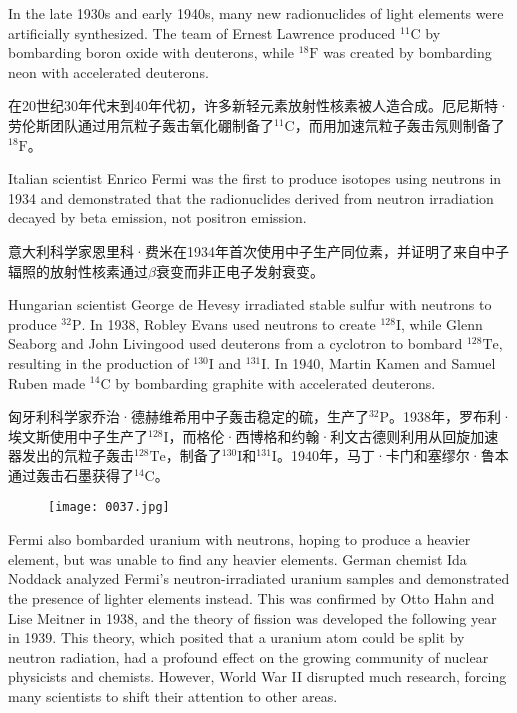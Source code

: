 \documentclass[dvipsnames, svgnames,a4paper,11pt]{article}
\begin{document}
In the late 1930s and early 1940s, many new radionuclides of light elements were artificially synthesized. The team of Ernest Lawrence produced ${}^\text{11}\text{C}$ by bombarding boron oxide with deuterons, while ${}^\text{18}\text{F}$ was created by bombarding neon with accelerated deuterons.

在20世纪30年代末到40年代初，许多新轻元素放射性核素被人造合成。厄尼斯特·劳伦斯团队通过用氘粒子轰击氧化硼制备了${}^\text{11}\text{C}$，而用加速氘粒子轰击氖则制备了${}^\text{18}\text{F}$。

Italian scientist Enrico Fermi was the first to produce isotopes using neutrons in 1934 and demonstrated that the radionuclides derived from neutron irradiation decayed by beta emission, not positron emission.

意大利科学家恩里科·费米在1934年首次使用中子生产同位素，并证明了来自中子辐照的放射性核素通过$\beta$衰变而非正电子发射衰变。

Hungarian scientist George de Hevesy irradiated stable sulfur with neutrons to produce ${}^\text{32}\text{P}$. In 1938, Robley Evans used neutrons to create ${}^\text{128}\text{I}$, while Glenn Seaborg and John Livingood used deuterons from a cyclotron to bombard ${}^\text{128}\text{Te}$, resulting in the production of ${}^\text{130}\text{I}$ and ${}^\text{131}\text{I}$. In 1940, Martin Kamen and Samuel Ruben made ${}^\text{14}\text{C}$ by bombarding graphite with accelerated deuterons.

匈牙利科学家乔治·德赫维希用中子轰击稳定的硫，生产了${}^\text{32}\text{P}$。1938年，罗布利·埃文斯使用中子生产了${}^\text{128}\text{I}$，而格伦·西博格和约翰·利文古德则利用从回旋加速器发出的氘粒子轰击${}^\text{128}\text{Te}$，制备了${}^\text{130}\text{I}$和${}^\text{131}\text{I}$。1940年，马丁·卡门和塞缪尔·鲁本通过轰击石墨获得了${}^\text{14}\text{C}$。

\begin{figure}[htbp]
      \centering
      \texttt{[image: 0037.jpg]}
       \label{fig27}
\end{figure}

Fermi also bombarded uranium with neutrons, hoping to produce a heavier element, but was unable to find any heavier elements. German chemist Ida Noddack analyzed Fermi’s neutron-irradiated uranium samples and demonstrated the presence of lighter elements instead. This was confirmed by Otto Hahn and Lise Meitner in 1938, and the theory of fission was developed the following year in 1939. This theory, which posited that a uranium atom could be split by neutron radiation, had a profound effect on the growing community of nuclear physicists and chemists. However, World War II disrupted much research, forcing many scientists to shift their attention to other areas.
\end{document}
